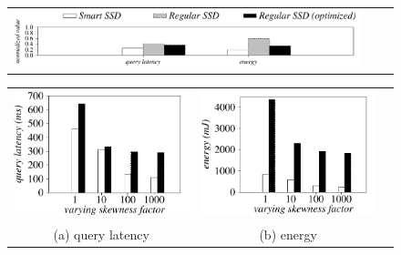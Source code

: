 \begin{figure}[htbp]
  \centering
    \begin{tabular}{ccc}
 \includegraphics[width=0.95\columnwidth]{figures/banner.pdf}%
\end{tabular}
\renewcommand{\tabcolsep}{0.1mm}


  \begin{tabular}{ccc}
 \includegraphics[width=0.5\columnwidth]{figures/Intersection-time-VaryListSkew2-eps-converted-to.pdf}&
  \includegraphics[width=0.5\columnwidth]{figures/Intersection-energy-VaryListSkew2-eps-converted-to.pdf}\\
  (a) query latency & (b) energy\\


\end{tabular}
\end{figure}

